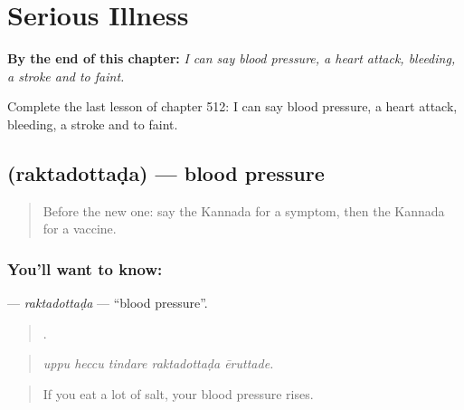 
\chapter{Serious Illness}
\label{ch:ka-serious-illness}

\begin{chapteropening}
\textbf{By the end of this chapter:} \emph{I can say blood pressure, a heart attack, bleeding, a stroke and to faint.}

Complete the last lesson of chapter 512: I can say blood pressure, a heart attack, bleeding, a stroke and to faint.
\end{chapteropening}

\section[\texorpdfstring{\kn{ರಕ್ತದೊತ್ತಡ} (raktadottaḍa)}{ರಕ್ತದೊತ್ತಡ (raktadottaḍa)}]{ (raktadottaḍa) — blood pressure}

\label{lesson:KA-C512-raktadottada}



\begin{quote}
Before the new one: say the Kannada for a symptom, then the Kannada for a vaccine.
\end{quote}

\subsection*{You'll want to know: }
\textbf{} — \emph{raktadottaḍa} — \textquotedblleft{}blood pressure\textquotedblright{}.

\begin{quote}
    .
\end{quote}

\begin{quote}
\emph{uppu heccu tindare raktadottaḍa ēruttade.}
\end{quote}

\begin{quote}
If you eat a lot of salt, your blood pressure rises.
\end{quote}

